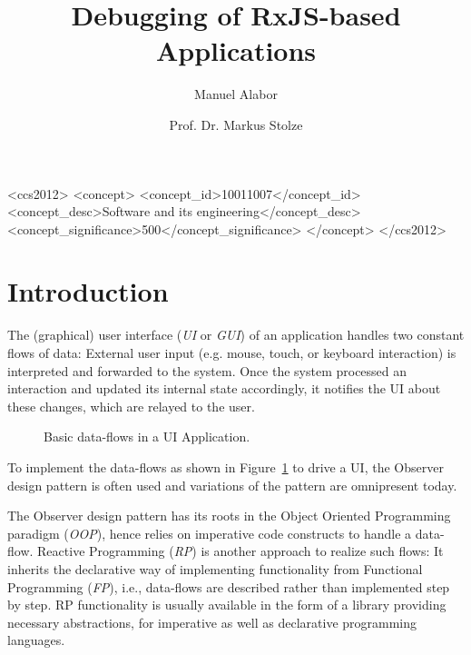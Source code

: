 \documentclass[sigplan,screen]{acmart}
\title{Debugging of RxJS-based Applications}
\author{Manuel Alabor}
\affiliation{
	\institution{Eastern Switzerland University of Applied Sciences}
	\city{Rapperswil}
	\country{Switzerland}
}
\author{Prof. Dr. Markus Stolze}
\affiliation{
	\institution{Eastern Switzerland University of Applied Sciences}
	\city{Rapperswil}
	\country{Switzerland}
}
\begin{document}
\begin{abstract}
	
\end{abstract}

\begin{CCSXML}
	<ccs2012>
	   <concept>
		   <concept_id>10011007</concept_id>
		   <concept_desc>Software and its engineering</concept_desc>
		   <concept_significance>500</concept_significance>
		   </concept>
	 </ccs2012>
\end{CCSXML}



\maketitle

\section{Introduction}

The (graphical) user interface (\emph{UI} or \emph{GUI}) of an application handles two constant flows of data: External user input (e.g. mouse, touch, or keyboard interaction) is interpreted and forwarded to the system. Once the system processed an interaction and updated its internal state accordingly, it notifies the UI about these changes, which are relayed to the user.

\begin{figure}
	\centering
	\caption{Basic data-flows in a UI Application.}
	\label{fig:ui-data-flows}
\end{figure}

To implement the data-flows as shown in Figure~\ref{fig:ui-data-flows} to drive a UI, the Observer design pattern\cite{gamma1995design} is often used and variations of the pattern are omnipresent today\cite{alabor:2019:reactiveappllications}.

The Observer design pattern has its roots in the Object Oriented Programming paradigm (\emph{OOP}), hence relies on imperative code constructs to handle a data-flow. Reactive Programming (\emph{RP}) is another approach to realize such flows: It inherits the declarative way of implementing functionality from Functional Programming (\emph{FP}), i.e., data-flows are described rather than implemented step by step\cite{10.1145/2501654.2501666}. RP functionality is usually available in the form of a library providing necessary abstractions, for imperative as well as declarative programming languages.
\end{document}
